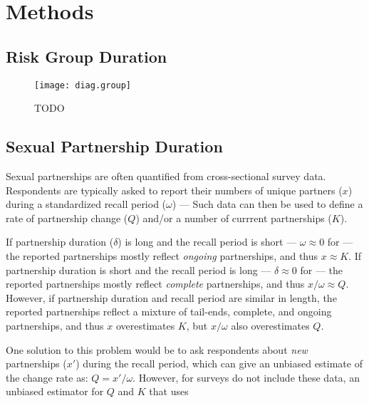 \section{Methods}\label{meth}
\subsection{Risk Group Duration}\label{meth.group}
\begin{figure}
  \centering\texttt{[image: diag.group]}
  \caption{TODO}
  \label{fig:diag.group}
\end{figure}
\subsection{Sexual Partnership Duration}\label{meth.partners}
Sexual partnerships are often quantified from cross-sectional survey data.
Respondents are typically asked to report
their numbers of unique partners ($x$) during a standardized recall period ($\omega$) --- \eg
{}
Such data can then be used to define
a rate of partnership change ($Q$) and/or a number of currrent partnerships ($K$).
\par
If partnership duration ($\delta$) is long and the recall period is short
--- \eg $\omega \approx 0$ for
 ---
the reported partnerships mostly reflect \emph{ongoing} partnerships,
and thus $x \approx K$.
If partnership duration is short and the recall period is long
--- \eg $\delta \approx 0$ for
 ---
the reported partnerships mostly reflect \emph{complete} partnerships,
and thus $x/\omega \approx Q$.
However, if partnership duration and recall period are similar in length,
the reported partnerships reflect a mixture of tail-ends, complete, and ongoing partnerships,
and thus $x$ overestimates $K$, but $x/\omega$ also overestimates $Q$.
\par
One solution to this problem would be to ask respondents about
\emph{new} partnerships ($x'$) during the recall period,
which can give an unbiased estimate of the change rate as: $Q = x'/\omega$.
However, for surveys do not include these data,
an unbiased estimator for $Q$ and $K$ that uses
